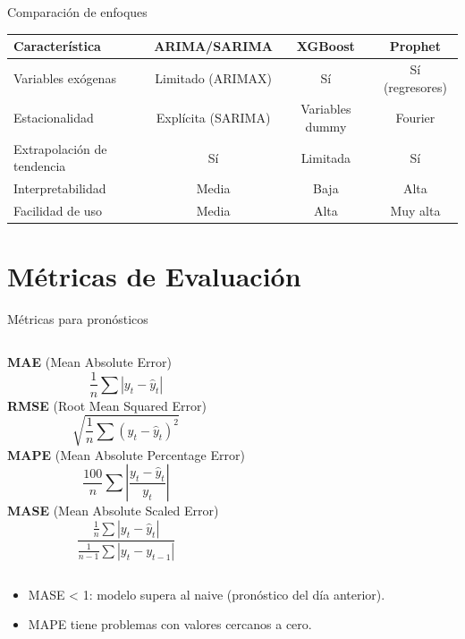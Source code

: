 \documentclass[aspectratio=169, 10pt, xcolor=table]{beamer}
\begin{document}
\begin{frame}{Comparación de enfoques}
    \begin{table}
        \centering
        \begin{tabular}{l|c|c|c}
            \toprule
            \textbf{Característica} & \textbf{ARIMA/SARIMA} & \textbf{XGBoost} & \textbf{Prophet} \\
            \midrule
            Variables exógenas & Limitado (ARIMAX) & Sí & Sí (regresores) \\
            Estacionalidad & Explícita (SARIMA) & Variables dummy & Fourier \\
            Extrapolación de tendencia & Sí & Limitada & Sí \\
            Interpretabilidad & Media & Baja & Alta \\
            Facilidad de uso & Media & Alta & Muy alta \\
            \bottomrule
        \end{tabular}
    \end{table}
\end{frame}

\section{Métricas de Evaluación}

\begin{frame}{Métricas para pronósticos}
    \begin{columns}[t]
        \textbf{MAE} (Mean Absolute Error)
        \[
        \frac{1}{n}\sum |y_t - \hat{y}_t|
        \]
        \textbf{RMSE} (Root Mean Squared Error)
        \[
        \sqrt{\frac{1}{n}\sum (y_t - \hat{y}_t)^2}
        \]
        \textbf{MAPE} (Mean Absolute Percentage Error)
        \[
        \frac{100}{n}\sum \left|\frac{y_t - \hat{y}_t}{y_t}\right|
        \]
        \textbf{MASE} (Mean Absolute Scaled Error)
        \[
        \frac{\frac{1}{n}\sum |y_t - \hat{y}_t|}{\frac{1}{n-1}\sum |y_t - y_{t-1}|}
        \]
    \end{columns}
    \vspace{0.3cm}
    \begin{itemize}
        \item MASE < 1: modelo supera al naive (pronóstico del día anterior).
        \item MAPE tiene problemas con valores cercanos a cero.
    \end{itemize}
\end{frame}
\end{document}
